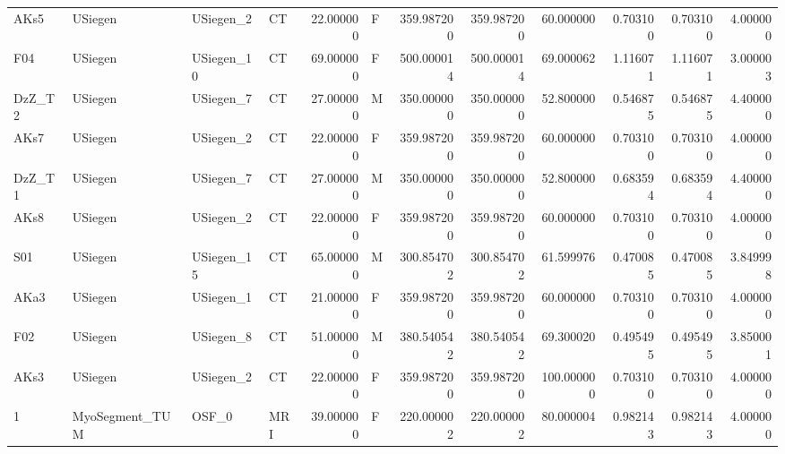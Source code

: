 \begin{tabular}{llllrlrrrrrr}
AKs5   &         USiegen &    USiegen\_2 &                 CT &  22.000000 &        F &       359.987200 &    359.987200 &   60.000000 &               0.703100 &            0.703100 &          4.000000 \\
F04    &         USiegen &   USiegen\_10 &                 CT &  69.000000 &        F &       500.000014 &    500.000014 &   69.000062 &               1.116071 &            1.116071 &          3.000003 \\
DzZ\_T2 &         USiegen &    USiegen\_7 &                 CT &  27.000000 &        M &       350.000000 &    350.000000 &   52.800000 &               0.546875 &            0.546875 &          4.400000 \\
AKs7   &         USiegen &    USiegen\_2 &                 CT &  22.000000 &        F &       359.987200 &    359.987200 &   60.000000 &               0.703100 &            0.703100 &          4.000000 \\
DzZ\_T1 &         USiegen &    USiegen\_7 &                 CT &  27.000000 &        M &       350.000000 &    350.000000 &   52.800000 &               0.683594 &            0.683594 &          4.400000 \\
AKs8   &         USiegen &    USiegen\_2 &                 CT &  22.000000 &        F &       359.987200 &    359.987200 &   60.000000 &               0.703100 &            0.703100 &          4.000000 \\
S01    &         USiegen &   USiegen\_15 &                 CT &  65.000000 &        M &       300.854702 &    300.854702 &   61.599976 &               0.470085 &            0.470085 &          3.849998 \\
AKa3   &         USiegen &    USiegen\_1 &                 CT &  21.000000 &        F &       359.987200 &    359.987200 &   60.000000 &               0.703100 &            0.703100 &          4.000000 \\
F02    &         USiegen &    USiegen\_8 &                 CT &  51.000000 &        M &       380.540542 &    380.540542 &   69.300020 &               0.495495 &            0.495495 &          3.850001 \\
AKs3   &         USiegen &    USiegen\_2 &                 CT &  22.000000 &        F &       359.987200 &    359.987200 &  100.000000 &               0.703100 &            0.703100 &          4.000000 \\
1      &  MyoSegment\_TUM &        OSF\_0 &                MRI &  39.000000 &        F &       220.000002 &    220.000002 &   80.000004 &               0.982143 &            0.982143 &          4.000000 \\

\end{tabular}
